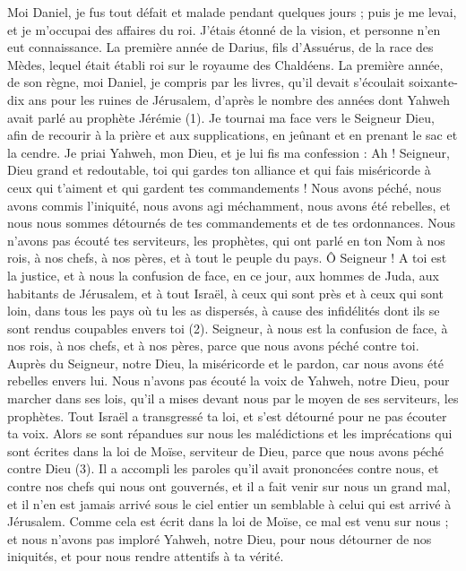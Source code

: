\begin{multicols}{2}
Moi Daniel, je fus tout défait et malade pendant quelques jours ; puis je me levai, et je m’occupai des affaires du roi.  J’étais étonné de la vision, et personne n’en eut connaissance.
\VerseOne{}La première année de Darius, fils d'Assuérus, de la race des Mèdes, lequel était établi roi sur le royaume des Chaldéens.
La première année, de son règne, moi Daniel, je compris par les livres, qu’il devait s’écoulait soixante-dix ans pour les ruines de Jérusalem, d’après le nombre des années dont Yahweh avait parlé au prophète Jérémie (1).
Je tournai ma face vers le Seigneur Dieu, afin de recourir à la prière et aux supplications, en jeûnant et en prenant le sac et la cendre.
Je priai Yahweh, mon Dieu, et je lui fis ma confession : Ah ! Seigneur, Dieu grand et redoutable, toi qui gardes ton alliance et qui fais  miséricorde à ceux qui t'aiment et qui gardent tes commandements !
Nous avons péché, nous avons commis l'iniquité, nous avons agi méchamment, nous avons été rebelles, et nous nous sommes détournés de tes commandements et de tes ordonnances.
Nous n'avons pas écouté tes serviteurs, les prophètes, qui ont parlé en ton Nom à nos rois, à nos chefs, à nos pères, et à tout le peuple du pays.
Ô Seigneur ! A toi est la justice, et à nous la confusion de face, en ce jour, aux hommes de Juda, aux habitants de Jérusalem, et à tout Israël, à ceux qui sont près et à ceux qui sont loin, dans tous les pays où tu les as dispersés, à cause des infidélités dont ils se sont rendus coupables envers toi (2).
Seigneur, à nous est la confusion de face, à nos rois, à nos chefs, et à nos pères, parce que nous avons péché contre toi.
Auprès du Seigneur, notre Dieu, la miséricorde et le pardon, car nous avons été rebelles envers lui.
Nous n'avons pas écouté la voix de Yahweh, notre Dieu, pour marcher dans ses lois, qu'il a mises devant nous par le moyen de ses serviteurs, les prophètes.
Tout Israël a transgressé ta loi, et s’est détourné pour ne pas écouter ta voix. Alors se sont répandues sur nous les malédictions et les imprécations qui sont écrites dans la loi de Moïse, serviteur de Dieu, parce que nous avons péché contre Dieu (3).
Il a accompli les paroles qu'il avait prononcées contre nous, et contre nos chefs qui nous ont gouvernés, et il a fait venir sur nous un grand mal, et il n’en est jamais arrivé sous le ciel entier un semblable à celui qui est arrivé à Jérusalem.
Comme cela est écrit dans la loi de Moïse, ce mal est venu sur nous ; et nous n'avons pas imploré Yahweh, notre Dieu, pour nous détourner de nos iniquités, et pour nous rendre attentifs à ta vérité.

\end{multicols}
